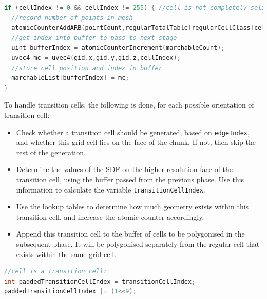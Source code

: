 \documentclass[11pt]{article}
\begin{document}
\begin{enumerate}
\begin{lstlisting}[language=C++,label={tv_count_regular},caption={Code for counting the number of vertices and marchable grid cells in the chunk. Variable \texttt{cellIndex} is calculated according to listing \ref{tv_transition_tables}, using the SDF values from the previous stage.}]
if (cellIndex != 0 && cellIndex != 255) { //cell is not completely solid or air
  //record number of points in mesh
  atomicCounterAddARB(pointCount,regularTotalTable[regularCellClass[cellIndex]]);
  //get index into buffer to pass to next stage
  uint bufferIndex = atomicCounterIncrement(marchableCount);
  uvec4 mc = uvec4(gid.x,gid.y,gid.z,cellIndex);
  //store cell position and index in buffer
  marchableList[bufferIndex] = mc;
}
\end{lstlisting}
To handle transition cells, the following is done, for each possible orientation of transition cell:
\begin{itemize}
  \item Check whether a transition cell should be generated, based on \texttt{edgeIndex}, and whether this grid cell lies on the face of the chunk. If not, then skip the rest of the generation.
  \item Determine the values of the SDF on the higher resolution face of the transition cell, using the buffer passed from the previous phase. Use this information to calculate the variable \texttt{transitionCellIndex}.
  \item Use the lookup tables to determine how much geometry exists within this transition cell, and increase the atomic counter accordingly.
  \item Append this transition cell to the buffer of cells to be polygonised in the subsequent phase. It will be polygonised separately from the regular cell that exists within the same grid cell.
\end{itemize}

\begin{lstlisting}[language=C++,label={tv_count},caption={Part of the code responsible for counting the triangles in transition cells, and appending them to the geometry generation buffer. The first 9 bits of \texttt{paddedTransitionCellIndex} store the value of \texttt{transitionCellIndex}, calculated as shown in figure \ref{fig:tv_transition_cellIndex}. Bit 10 records that the cell is a transition cell, and exactly one of bits 11-16 will be set, to store the orientation of the cell.}]
//cell is a transition cell:
int paddedTransitionCellIndex = transitionCellIndex;
paddedTransitionCellIndex |= (1<<9);


\end{lstlisting}
\end{enumerate}
\end{document}
